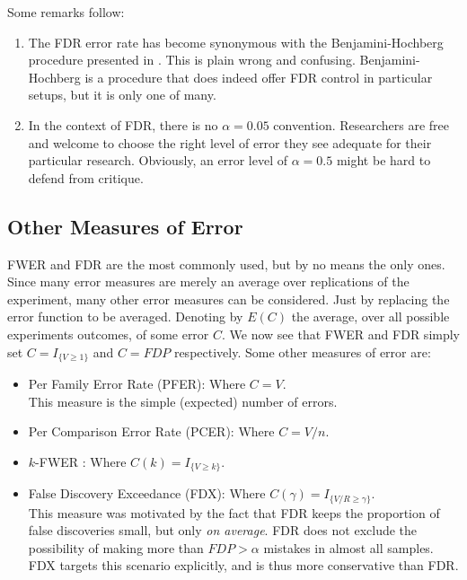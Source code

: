 \documentclass[review,12pt]{article}
\begin{document}
Some remarks follow:
\begin{enumerate}
\item The FDR error rate has become synonymous with the Benjamini-Hochberg procedure presented in \citep{benjamini_controlling_1995} . This is plain wrong and confusing. Benjamini-Hochberg is a procedure that does indeed offer FDR control in particular setups, but it is only one of many.
\item In the context of FDR, there is no $\alpha=0.05$ convention. Researchers are free and welcome to choose the right level of error they see adequate for their particular research. Obviously, an error level of $\alpha=0.5$ might be hard to defend from critique.
\end{enumerate}




\subsection{Other Measures of Error}
FWER and FDR are the most commonly used, but by no means the only ones. Since many error measures are merely an average over replications of the experiment, many other error measures can be considered. Just by replacing the error function to be averaged. Denoting by $E(C)$ the average, over all possible experiments outcomes, of some error $C$. We now see that FWER and FDR simply set  $C = I_{\{ V \geq 1 \} } $ and $C = FDP$ respectively.
Some other measures of error are:

\begin{itemize}
\item Per Family Error Rate (PFER): Where $C=V$.\\
This measure is the simple (expected) number of errors. 
\item Per Comparison Error Rate (PCER): Where $C=V/n$.\item $k$-FWER \citep{van_der_laan_augmentation_2004}: Where $C(k) = I_{\{ V \geq k \} }$.
\item False Discovery Exceedance (FDX)\citep{genovese_exceedance_2006}: Where $C(\gamma) = I_{\{ V/R \geq \gamma \} }$.\\
This measure was motivated by the fact that FDR keeps the proportion of false discoveries small, but only \emph{on average}. FDR does not exclude the possibility of making more than $FDP>\alpha$ mistakes in almost all samples. FDX targets this scenario explicitly, and is thus more conservative than FDR. 
\end{itemize}
\end{document}
